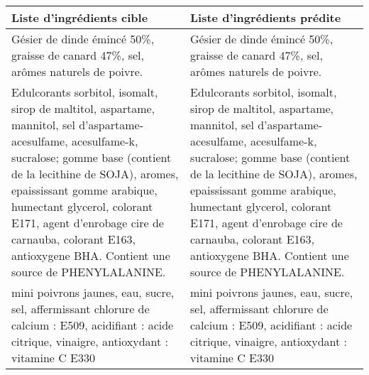 \begin{tabular}{p{7cm}p{7cm}}
\toprule
                                                                                                                                                                                                                                                                                                                                   Liste d'ingrédients cible &                                                                                                                                                                                                                                                                                                                                        Liste d'ingrédients prédite \\ \hline
\midrule
                                                                                                                                                                                                                                                                          Gésier de dinde émincé 50\%, graisse de canard 47\%, sel, arômes naturels de poivre. &                                                                                                                                                                                                                                                                            Gésier de dinde émincé 50\%,  graisse de canard 47\%, sel, arômes naturels de poivre.  \newline   \\ \hline
 Edulcorants sorbitol, isomalt, sirop de maltitol, aspartame, mannitol, sel d'aspartame-acesulfame, acesulfame-k, sucralose; gomme base (contient de la lecithine de SOJA), aromes, epaississant gomme arabique, humectant glycerol, colorant E171, agent d'enrobage cire de carnauba, colorant E163, antioxygene BHA. Contient une source de PHENYLALANINE. &  Edulcorants sorbitol, isomalt, sirop de maltitol, aspartame, mannitol, sel d'aspartame-acesulfame, acesulfame-k, sucralose;  \newline gomme base  (contient de la lecithine de SOJA), aromes, epaississant gomme arabique, humectant glycerol, colorant E171,  \newline agent d'enrobage cire de carnauba, colorant E163, antioxygene BHA. Contient une source de PHENYLALANINE.  \\ \hline
                                                                                                                                                                                                        mini poivrons jaunes, eau, sucre, sel, affermissant chlorure de calcium : E509, acidifiant : acide citrique, vinaigre, antioxydant : vitamine C E330 &                                                                                                                                                                                                          mini poivrons jaunes, eau, sucre, sel, affermissant chlorure de  \newline calcium : E509, acidifiant : acide citrique, vinaigre, antioxydant :  \newline vitamine C E330  \\ \hline

\end{tabular}

